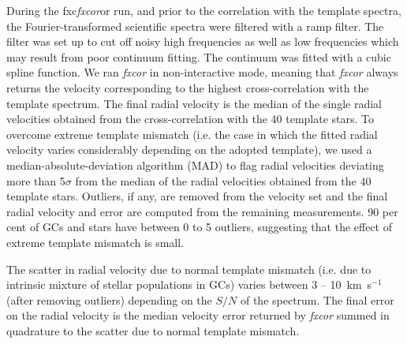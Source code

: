 \documentclass[useAMS,usenatbib]{mn2e}
\newcommand{\kms}{\mbox{\,km~s$^{-1}$}}
\begin{document}
During the fxc{\it fxcor}or run, and prior to the correlation with the template spectra, the Fourier-transformed scientific spectra were filtered with a ramp filter. The filter was set up to cut off noisy high frequencies as well as low frequencies which may result from poor continuum fitting. The continuum was fitted with a cubic spline function.
We ran {\it fxcor} in non-interactive mode, meaning that {\it fxcor} always returns the velocity corresponding to the highest cross-correlation with the template spectrum. The final radial velocity is the median of the single radial velocities obtained from the cross-correlation with the 40 template stars. %
To overcome extreme template mismatch (i.e. the case in which the fitted radial velocity varies considerably depending on the adopted template), we used a median-absolute-deviation algorithm (MAD) to flag radial velocities deviating more than 5$\sigma$ from the median of the radial velocities obtained from the 40 template stars. Outliers, if any, are removed from the velocity set and the final radial velocity and error are computed from the remaining measurements. 90 per cent of GCs and stars have between 0 to 5 outliers, suggesting that the effect of extreme template mismatch is small. 

The scatter in radial velocity due to normal template mismatch (i.e. due to intrinsic mixture of stellar populations in GCs) varies between 3 -- 10 \kms (after removing outliers) depending on the $S/N$ of the spectrum. The final error on the radial velocity is the median velocity error returned by {\it fxcor} summed in quadrature to the scatter due to normal template mismatch. 
\end{document}
